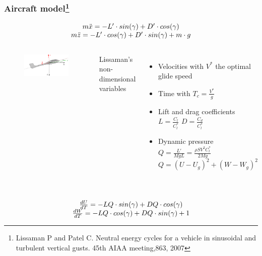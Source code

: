 \documentclass[compress]{beamer}
\begin{document}
\begin{frame}%
  \frametitle{Aircraft model\footnote{\tiny Lissaman P and Patel C. Neutral energy cycles for a vehicle in sinusoidal and turbulent vertical gusts. 45th AIAA meeting,863, 2007}}
  \begin{equation*}
    \begin{array}[c]{c}
      m \ddot{x} = -L' \cdot sin(\gamma) + D' \cdot cos(\gamma) \\
      m \ddot{z} = -L' \cdot cos(\gamma) + D' \cdot sin(\gamma) + m \cdot g
    \end{array}
  \end{equation*}
  \begin{columns}
    \begin{figure}[h]
      \centering
      \includegraphics[width=1\textwidth]{./Figures/glider.eps}
    \end{figure}
    Lissaman's non-dimensional variables
    \begin{itemize}
      \item Velocities with $V^{*}$ the optimal glide speed
      \item Time with $T_c=\frac{V^{*}}{g}$
      \item Lift and drag coefficients $L= \frac{C_l}{C_l^*}$ $D= \frac{C_d}{C_l^*}$
      \item Dynamic pressure $Q = \frac{L'}{MgL} = \frac{ \rho S V^{2} C_l^* }{2Mg}$ $Q=(U-U_g)^2+ (W-W_g)^2$
    \end{itemize}
  \end{columns}
  \begin{equation*}
    \begin{array}[c]{c}
      \\
      \frac{dU}{dT}= -LQ \cdot sin(\gamma) + DQ \cdot cos(\gamma) \\
      \frac{dW}{dT}= -LQ \cdot cos(\gamma) + DQ \cdot sin(\gamma) + 1
    \end{array}
  \end{equation*}
\end{frame}
\end{document}
